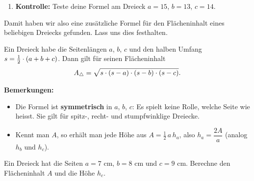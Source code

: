 \documentclass[11pt,oneside]{article}
\begin{document}
	\begin{enumerate}[label=\alph*), resume]
		\item {\bf Kontrolle:} Teste deine Formel am Dreieck $a=15$, $b=13$, $c=14$.
	\end{enumerate}
	Damit haben wir also eine zusätzliche Formel für den Flächeninhalt eines beliebigen Dreiecks gefunden. Lass uns dies festhalten.
	\begin{satz}
		\label{satz:heron}
		Ein Dreieck habe die Seitenlängen $a$, $b$, $c$ und den halben Umfang $s=\frac{1}{2}\cdot(a+b+c)$. Dann gilt für seinen Flächeninhalt \[A_\triangle=\sqrt{s\cdot(s-a)\cdot(s-b)\cdot(s-c)}.\]
	\end{satz}
	{\bf Bemerkungen:}
	\begin{itemize}
		\item Die Formel ist \textbf{symmetrisch} in $a$, $b$, $c$: Es spielt keine Rolle, welche Seite wie heisst. Sie gilt für spitz-, recht- und stumpfwinklige Dreiecke.
		\item Kennt man $A$, so erhält man jede Höhe aus $A=\frac12\,a\,h_a$, also $h_a=\dfrac{2A}{a}$ (analog $h_b$ und $h_c$).
	\end{itemize}
	\begin{beispiel}
		Ein Dreieck hat die Seiten $a=7$ cm, $b=8$ cm und $c=9$ cm. Berechne den Flächeninhalt $A$ und die Höhe $h_c$.
	\end{beispiel}
\end{document}
